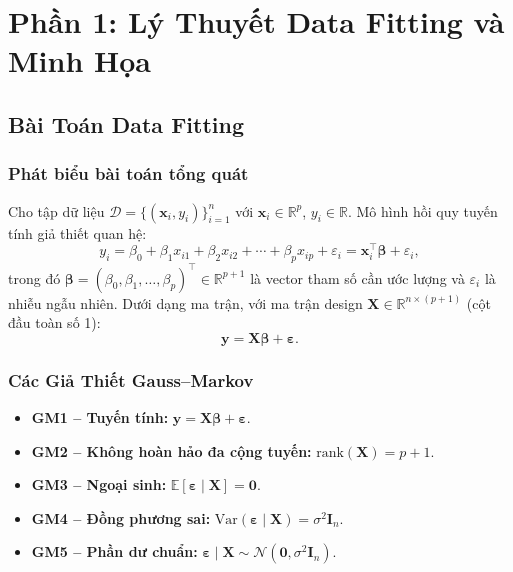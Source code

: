\section{Phần 1: Lý Thuyết Data Fitting và Minh Họa}

\subsection{Bài Toán Data Fitting}

\subsubsection{Phát biểu bài toán tổng quát}

Cho tập dữ liệu $\mathcal{D} = \{(\mathbf{x}_i, y_i)\}_{i=1}^{n}$ với
$\mathbf{x}_i \in \mathbb{R}^p$, $y_i \in \mathbb{R}$.
Mô hình hồi quy tuyến tính giả thiết quan hệ:
\begin{equation}
    y_i = \beta_0 + \beta_1 x_{i1} + \beta_2 x_{i2} + \cdots + \beta_p x_{ip} + \varepsilon_i
        = \mathbf{x}_i^\top \boldsymbol{\beta} + \varepsilon_i,
\end{equation}
trong đó $\boldsymbol{\beta} = (\beta_0, \beta_1, \ldots, \beta_p)^\top \in \mathbb{R}^{p+1}$
là vector tham số cần ước lượng và $\varepsilon_i$ là nhiễu ngẫu nhiên.
Dưới dạng ma trận, với ma trận design $\mathbf{X} \in \mathbb{R}^{n \times (p+1)}$
(cột đầu toàn số 1):
\begin{equation}
    \mathbf{y} = \mathbf{X}\boldsymbol{\beta} + \boldsymbol{\varepsilon}.
\end{equation}

\subsubsection{Các Giả Thiết Gauss--Markov}

\begin{itemize}
    \item \textbf{GM1 – Tuyến tính:} $\mathbf{y} = \mathbf{X}\boldsymbol{\beta} + \boldsymbol{\varepsilon}$.
    \item \textbf{GM2 – Không hoàn hảo đa cộng tuyến:} $\mathrm{rank}(\mathbf{X}) = p+1$.
    \item \textbf{GM3 – Ngoại sinh:} $\mathbb{E}[\boldsymbol{\varepsilon} \mid \mathbf{X}] = \mathbf{0}$.
    \item \textbf{GM4 – Đồng phương sai:}
        $\mathrm{Var}(\boldsymbol{\varepsilon} \mid \mathbf{X}) = \sigma^2 \mathbf{I}_n$.
    \item \textbf{GM5 – Phần dư chuẩn:}
        $\boldsymbol{\varepsilon} \mid \mathbf{X} \sim \mathcal{N}(\mathbf{0}, \sigma^2 \mathbf{I}_n)$.
\end{itemize}

